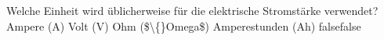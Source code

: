    {Welche Einheit wird üblicherweise für die elektrische Stromstärke verwendet?}
    {Ampere (A)}
    {Volt (V)}
    {Ohm (\$\textbackslash\{\}Omega\$)}
    {Amperestunden (Ah)}
    {false}{false}